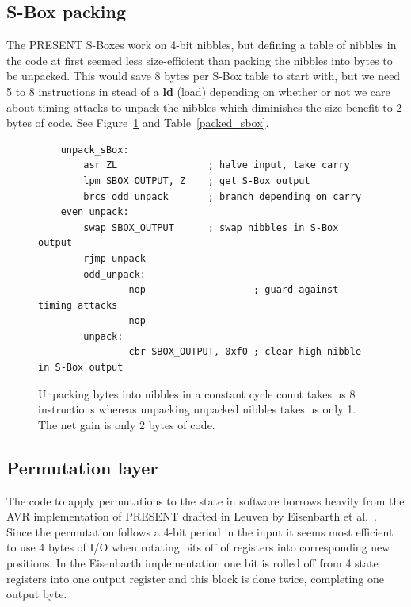 \documentclass[11pt]{article}
\begin{document}
\subsection{S-Box packing}\label{sbox_packing}
The PRESENT S-Boxes work on 4-bit nibbles, but defining a table of nibbles in the code at first seemed less size-efficient than packing the nibbles into bytes to be unpacked.
This would save 8 bytes per S-Box table to start with, but we need 5 to 8 instructions in stead of a \textbf{ld} (load) depending on whether or not we care about timing attacks to unpack the nibbles which diminishes the size benefit to 2 bytes of code. See Figure~\ref{unpacking_code} and Table~\ref{packed_sbox}.

\begin{figure}
\begin{lstlisting}
	unpack_sBox:
		asr ZL                ; halve input, take carry
		lpm SBOX_OUTPUT, Z    ; get S-Box output
		brcs odd_unpack       ; branch depending on carry
	even_unpack:
		swap SBOX_OUTPUT      ; swap nibbles in S-Box output
		rjmp unpack
        odd_unpack:
                nop                   ; guard against timing attacks
                nop
        unpack:
                cbr SBOX_OUTPUT, 0xf0 ; clear high nibble in S-Box output
	\end{lstlisting}
	\caption{\footnotesize Unpacking bytes into nibbles in a constant cycle count takes us 8 instructions whereas unpacking unpacked nibbles takes us only 1. The net gain is only 2 bytes of code.}
\label{unpacking_code}
\end{figure}



\subsection{Permutation layer}
The code to apply permutations to the state in software borrows heavily from the AVR implementation of PRESENT drafted in Leuven by Eisenbarth et al.~\cite{eisenbarth2012compact}.
Since the permutation follows a 4-bit period in the input it seems most efficient to use 4 bytes of I/O when rotating bits off of registers into corresponding new positions.
In the Eisenbarth implementation one bit is rolled off from 4 state registers into one output register and this block is done twice, completing one output byte.
\end{document}
